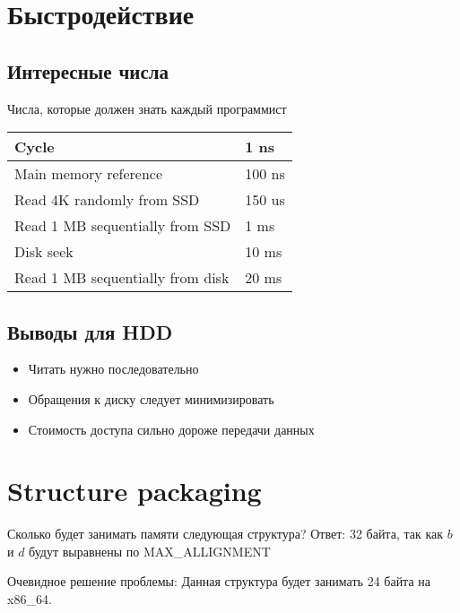 \documentclass[../lectures.tex]{subfiles}
\begin{document}
\section{Быстродействие}
\subsection{Интересные числа}
\begin{center}
Числа, которые должен знать каждый программист
\begin{tabular}{| l | l |}
    \hline
    Cycle                            & 1   ns \\ \hline
    Main memory reference            & 100 ns \\ \hline
    Read 4K randomly from SSD        & 150 us \\ \hline
    Read 1 MB sequentially from SSD  & 1   ms \\ \hline
    Disk seek                        & 10  ms \\ \hline
    Read 1 MB sequentially from disk & 20  ms \\ \hline
\end{tabular}
\end{center}
\subsection{Выводы для HDD}
\begin{itemize}
    \item Читать нужно последовательно
    \item Обращения к диску следует минимизировать
    \item Стоимость доступа сильно дороже передачи данных
\end{itemize}

\section{Structure packaging}
Сколько будет занимать памяти следующая структура?
Ответ: 32 байта, так как $b$ и $d$ будут выравнены по MAX\_ALLIGNMENT

Очевидное решение проблемы:
Данная структура будет занимать 24 байта на x86\_64.
\end{document}
